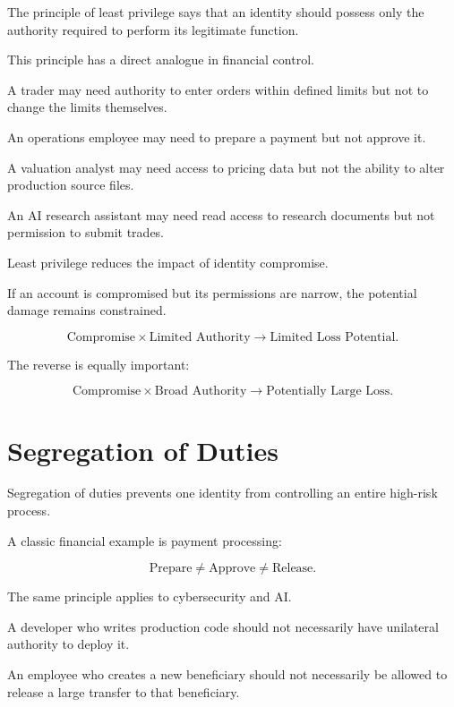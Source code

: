 The principle of least privilege says that an identity should possess only the authority required to perform its legitimate function.

This principle has a direct analogue in financial control.

A trader may need authority to enter orders within defined limits but not to change the limits themselves.

An operations employee may need to prepare a payment but not approve it.

A valuation analyst may need access to pricing data but not the ability to alter production source files.

An AI research assistant may need read access to research documents but not permission to submit trades.

Least privilege reduces the impact of identity compromise.

If an account is compromised but its permissions are narrow, the potential damage remains constrained.

\begin{equation}
\text{Compromise}
\times
\text{Limited Authority}
\rightarrow
\text{Limited Loss Potential}.
\end{equation}

The reverse is equally important:

\begin{equation}
\text{Compromise}
\times
\text{Broad Authority}
\rightarrow
\text{Potentially Large Loss}.
\end{equation}

\section{Segregation of Duties}

Segregation of duties prevents one identity from controlling an entire high-risk process.

A classic financial example is payment processing:

\begin{equation}
\text{Prepare}
\neq
\text{Approve}
\neq
\text{Release}.
\end{equation}

The same principle applies to cybersecurity and AI.

A developer who writes production code should not necessarily have unilateral authority to deploy it.

An employee who creates a new beneficiary should not necessarily be allowed to release a large transfer to that beneficiary.

